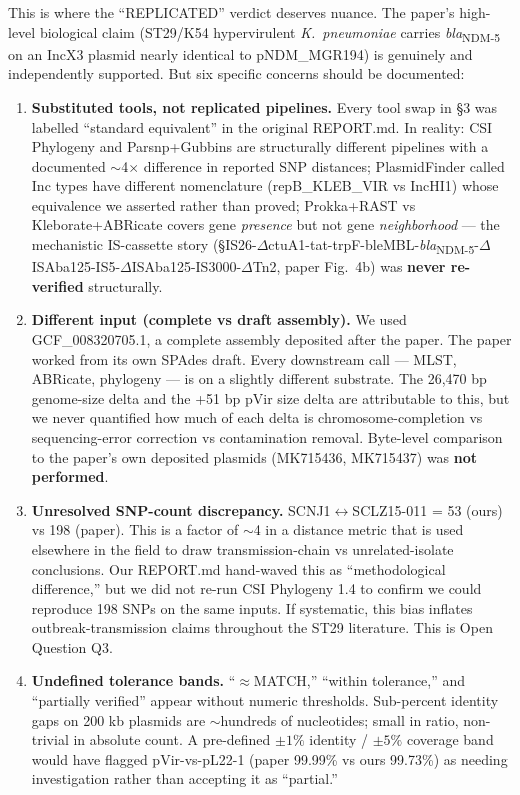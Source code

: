 \documentclass[11pt,letterpaper]{article}
\begin{document}
This is where the ``REPLICATED'' verdict deserves nuance. The paper's high-level biological claim (ST29/K54 hypervirulent \textit{K.\ pneumoniae} carries \textit{bla}\textsubscript{NDM-5} on an IncX3 plasmid nearly identical to pNDM\_MGR194) is genuinely and independently supported. But six specific concerns should be documented:

\begin{enumerate}
\item \textbf{Substituted tools, not replicated pipelines.} Every tool swap in \S3 was labelled ``standard equivalent'' in the original REPORT.md. In reality: CSI Phylogeny and Parsnp+Gubbins are structurally different pipelines with a documented $\sim$4$\times$ difference in reported SNP distances; PlasmidFinder called Inc types have different nomenclature (repB\_KLEB\_VIR vs IncHI1) whose equivalence we asserted rather than proved; Prokka+RAST vs Kleborate+ABRicate covers gene \emph{presence} but not gene \emph{neighborhood} --- the mechanistic IS-cassette story (\S{}IS26-$\Delta$ctuA1-tat-trpF-bleMBL-\textit{bla}\textsubscript{NDM-5}-$\Delta$ISAba125-IS5-$\Delta$ISAba125-IS3000-$\Delta$Tn2, paper Fig.~4b) was \textbf{never re-verified} structurally.

\item \textbf{Different input (complete vs draft assembly).} We used GCF\_008320705.1, a complete assembly deposited after the paper. The paper worked from its own SPAdes draft. Every downstream call --- MLST, ABRicate, phylogeny --- is on a slightly different substrate. The 26{,}470 bp genome-size delta and the +51 bp pVir size delta are attributable to this, but we never quantified how much of each delta is chromosome-completion vs sequencing-error correction vs contamination removal. Byte-level comparison to the paper's own deposited plasmids (MK715436, MK715437) was \textbf{not performed}.

\item \textbf{Unresolved SNP-count discrepancy.} SCNJ1$\leftrightarrow$SCLZ15-011 = 53 (ours) vs 198 (paper). This is a factor of $\sim$4 in a distance metric that is used elsewhere in the field to draw transmission-chain vs unrelated-isolate conclusions. Our REPORT.md hand-waved this as ``methodological difference,'' but we did not re-run CSI Phylogeny 1.4 to confirm we could reproduce 198 SNPs on the same inputs. If systematic, this bias inflates outbreak-transmission claims throughout the ST29 literature. This is Open Question Q3.

\item \textbf{Undefined tolerance bands.} ``$\approx$MATCH,'' ``within tolerance,'' and ``partially verified'' appear without numeric thresholds. Sub-percent identity gaps on 200 kb plasmids are $\sim$hundreds of nucleotides; small in ratio, non-trivial in absolute count. A pre-defined $\pm 1\%$ identity / $\pm 5\%$ coverage band would have flagged pVir-vs-pL22-1 (paper 99.99\% vs ours 99.73\%) as needing investigation rather than accepting it as ``partial.''


\end{enumerate}
\end{document}
